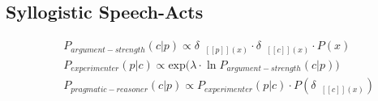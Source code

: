 \documentclass{llncs} %
\newcommand{\denote}[1]{\mbox{ $[\![ #1 ]\!]$}}
\begin{document}
%

\subsection{Syllogistic Speech-Acts}

\begin{eqnarray}
&&P_{argument-strength}(c|p)\propto \delta_{\denote{p}(x)} \cdot  \delta_{\denote{c}(x)} \cdot P(x) \\ %
&&P_{experimenter}(p|c) \propto \mathrm{exp}({\lambda \cdot \ln P_{argument-strength}(c|p))}\\ 
&&P_{pragmatic-reasoner}(c|p)\propto P_{experimenter}(p|c)\cdot P(\delta_{\denote{c}(x)})
\end{eqnarray}
\end{document}
